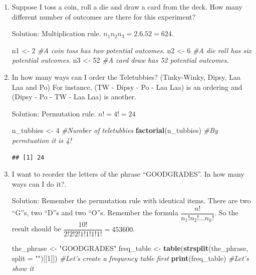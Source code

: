 \documentclass[]{book}
\newenvironment{Shaded}{\begin{snugshade}}{\end{snugshade}}
\newcommand{\CommentTok}[1]{\textcolor[rgb]{0.56,0.35,0.01}{\textit{#1}}}
\newcommand{\DataTypeTok}[1]{\textcolor[rgb]{0.13,0.29,0.53}{#1}}
\newcommand{\DecValTok}[1]{\textcolor[rgb]{0.00,0.00,0.81}{#1}}
\newcommand{\KeywordTok}[1]{\textcolor[rgb]{0.13,0.29,0.53}{\textbf{#1}}}
\newcommand{\NormalTok}[1]{#1}
\newcommand{\StringTok}[1]{\textcolor[rgb]{0.31,0.60,0.02}{#1}}
\theoremstyle{definition}
\theoremstyle{definition}
\theoremstyle{definition}
\theoremstyle{remark}
\begin{document}
\begin{enumerate}
\def\labelenumi{\arabic{enumi}.}
\item
  Suppose I toss a coin, roll a die and draw a card from the deck. How
  many different number of outcomes are there for this experiment?

  Solution: Multiplication rule. \(n_1n_2n_3 = 2.6.52 = 624\).

\begin{Shaded}
\begin{Highlighting}[]
\NormalTok{n1 <-}\StringTok{ }\DecValTok{2} \CommentTok{#A coin toss has two potential outcomes.}
\NormalTok{n2 <-}\StringTok{ }\DecValTok{6} \CommentTok{#A die roll has six potential outcomes.}
\NormalTok{n3 <-}\StringTok{ }\DecValTok{52} \CommentTok{#A card draw has 52 potential outcomes.}
\end{Highlighting}
\end{Shaded}
\item
  In how many ways can I order the Teletubbies? (Tinky-Winky, Dipsy, Laa
  Laa and Po) For instance, (TW - Dipsy - Po - Laa Laa) is an ordering
  and (Dipsy - Po - TW - Laa Laa) is another.

  Solution: Permutation rule. \(n! = 4! = 24\)

\begin{Shaded}
\begin{Highlighting}[]
\NormalTok{n_tubbies <-}\StringTok{ }\DecValTok{4} \CommentTok{#Number of teletubbies}
\KeywordTok{factorial}\NormalTok{(n_tubbies) }\CommentTok{#By permtuation it is 4!}
\end{Highlighting}
\end{Shaded}

\begin{verbatim}
## [1] 24
\end{verbatim}
\item
  I want to reorder the letters of the phrase ``GOODGRADES''. In how
  many ways can I do it?.

  Solution: Remember the permutation rule with identical items. There
  are two ``G''s, two ``D''s and two ``O''s. Remember the formula
  \(\dfrac{n!}{n_1!n_2!\dots n_k!}\). So the result should be
  \(\dfrac{10!}{2!2!2!1!1!1!1!} = 453600\).

\begin{Shaded}
\begin{Highlighting}[]
\NormalTok{the_phrase <-}\StringTok{ "GOODGRADES"}
\NormalTok{freq_table <-}\StringTok{ }\KeywordTok{table}\NormalTok{(}\KeywordTok{strsplit}\NormalTok{(the_phrase, }\DataTypeTok{split =} \StringTok{""}\NormalTok{)[[}\DecValTok{1}\NormalTok{]])  }\CommentTok{#Let's create a frequency table first}
\KeywordTok{print}\NormalTok{(freq_table)  }\CommentTok{#Let's show it}
\end{Highlighting}
\end{Shaded}


\end{enumerate}
\end{document}
